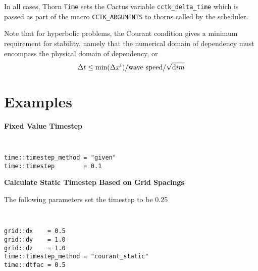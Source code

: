 \documentclass{article}
\begin{document}
In all cases, Thorn {\tt Time} sets the Cactus variable {\tt cctk\_delta\_time}
which is passed as part of the macro {\tt CCTK\_ARGUMENTS} to thorns called 
by the scheduler.

Note that for hyperbolic problems, the Courant condition gives a minimum 
requirement for stability, namely that the numerical domain of dependency
must encompass the physical domain of dependency, or
$$
\Delta t \le \mbox{min}(\Delta x^i)/\mbox{wave speed}/\sqrt{\mbox dim}
$$

\section{Examples}

\noindent
{\bf Fixed Value Timestep}

{\tt
\begin{verbatim}
time::timestep_method = "given"
time::timestep        = 0.1
\end{verbatim}
}


\noindent
{\bf Calculate Static Timestep Based on Grid Spacings}

\noindent
The following parameters set the timestep to be 0.25

{\tt
\begin{verbatim}
grid::dx    = 0.5
grid::dy    = 1.0
grid::dz    = 1.0
time::timestep_method = "courant_static"
time::dtfac = 0.5
\end{verbatim}
}

\end{document}

